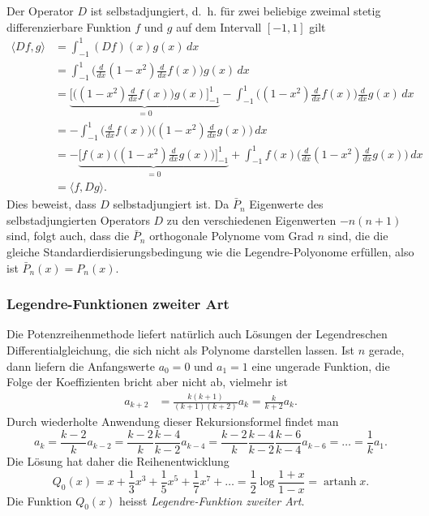 Der Operator $D$ ist selbstadjungiert, d.~h.
für zwei beliebige zweimal stetig differenzierbare Funktion $f$ und $g$
auf dem Intervall $[-1,1]$ gilt
\begin{align*}
\langle Df,g\rangle
&=
\int_{-1}^1 (Df)(x) g(x) \,dx
\\
&=
\int_{-1}^1
\biggl(\frac{d}{dx} (1-x^2)\frac{d}{dx}f(x)\biggr) g(x)
\,dx
\\
&=
\underbrace{
\biggl[
\biggl((1-x^2)\frac{d}{dx}f(x)\biggr) g(x)
\biggr]_{-1}^1
}_{\displaystyle = 0}
-
\int_{-1}^1
\biggl((1-x^2)\frac{d}{dx}f(x)\biggr) \frac{d}{dx}g(x)
\,dx
\\
&=
-
\int_{-1}^1
\biggl(\frac{d}{dx}f(x)\biggr) \biggl((1-x^2)\frac{d}{dx}g(x)\biggr)
\,dx
\\
&=
-
\underbrace{
\biggl[
f(x) \biggl((1-x^2)\frac{d}{dx}g(x)\biggr)
\biggr]_{-1}^1}_{\displaystyle = 0}
+
\int_{-1}^1
f(x) \biggl(\frac{d}{dx}(1-x^2)\frac{d}{dx}g(x)\biggr)
\,dx
\\
&=
\langle f,Dg\rangle.
\end{align*}
Dies beweist, dass $D$ selbstadjungiert ist.
Da $\bar{P}_n$ Eigenwerte des selbstadjungierten Operators $D$ zu
den verschiedenen Eigenwerten $-n(n+1)$ sind, folgt auch, dass
die $\bar{P}_n$ orthogonale Polynome vom Grad $n$ sind, die die 
gleiche Standardierdisierungsbedingung wie die Legendre-Polyonome
erfüllen, also ist $\bar{P}_n(x)=P_n(x)$.

\subsubsection{Legendre-Funktionen zweiter Art}
%
Die Potenzreihenmethode liefert natürlich auch Lösungen der
Legendreschen Differentialgleichung, die sich nicht als Polynome
darstellen lassen.
Ist $n$ gerade, dann liefern die Anfangswerte $a_0=0$ und $a_1=1$ 
eine ungerade Funktion, die Folge der Koeffizienten bricht
aber nicht ab, vielmehr ist
\begin{align*}
a_{k+2}
&=
\frac{k(k+1)}{(k+1)(k+2)}a_k
=
\frac{k}{k+2}a_k.
\end{align*}
Durch wiederholte Anwendung dieser Rekursionsformel findet man
\[
a_{k}
=
\frac{k-2}{k}a_{k-2}
=
\frac{k-2}{k}\frac{k-4}{k-2}a_{k-4}
=
\frac{k-2}{k}\frac{k-4}{k-2}\frac{k-6}{k-4}a_{k-6}
=
\dots
=
\frac{1}{k}a_1.
\]
Die Lösung hat daher die Reihenentwicklung
\[
Q_0(x) = x+\frac13x^3 + \frac15x^5 + \frac17x^7+\dots
=
\frac12\log \frac{1+x}{1-x}
=
\operatorname{artanh}x.
\]
Die Funktion $Q_0(x)$ heisst {\em Legendre-Funktion zweiter Art}.

